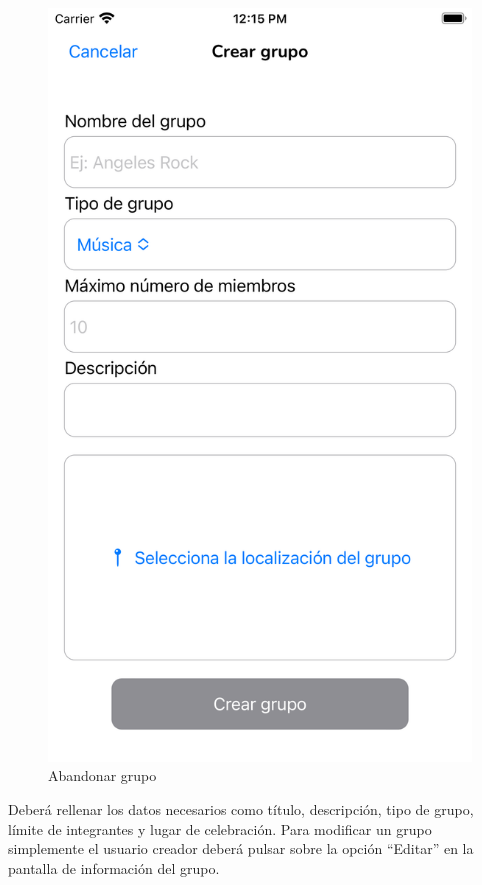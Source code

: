 \begin{appendices}
\begin{figure}[H]
\begin{minipage}{0.3\textwidth}
        \end{minipage}
        \begin{minipage}{0.3\textwidth}
            \centering
            \includegraphics[cframe=black 2pt,width=1\linewidth]{images/manual/crearGrupo.png}
        \end{minipage}
        \caption{Abandonar grupo}
        \label{fig:my_label}
\end{figure}
Deberá rellenar los datos necesarios como título, descripción, tipo de grupo, límite de integrantes y lugar de celebración.
Para modificar un grupo simplemente el usuario creador deberá pulsar sobre la opción ``Editar'' en la pantalla de información del grupo.


\end{appendices}
